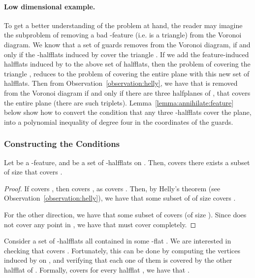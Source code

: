 \InSubmitVer{\documentclass[11pt]{article}}
\numberwithin{figure}{section}
\numberwithin{table}{section}
\numberwithin{equation}{section}
\newcommand{\lemlab}[1]{\label{lemma:#1}}
\newcommand{\lemref}[1]{Lemma~\ref{lemma:#1}}
\newcommand{\obslab}[1]{\label{observation:#1}}
\newcommand{\obsref}[1]{Observation~\ref{observation:#1}}
\begin{document}
\paragraph{Low dimensional example.}
To get a better understanding of the problem at hand, the reader may
imagine the subproblem of removing a bad -feature 
(i.e.  is a triangle) from the Voronoi diagram. We know that
a set  of  guards removes  from the Voronoi
diagram, if and only if the  -halfflats induced by 
cover the triangle . If we add the feature-induced halfflats
induced by  to the above set of halfflats, then the problem
of covering the triangle , reduces to the problem of
covering the entire plane with this new set  of 
halfflats. Then from \obsref{helly}, we have that  is
removed from the Voronoi diagram if and only if there are three
halfplanes of , that covers the entire plane (there are 
such triplets).  \lemref{annihilate:feature} below show how to convert
the condition that any three -halfflats cover the plane, into a
polynomial inequality of degree four in the coordinates of the guards.


\subsubsection{Constructing the Conditions}



\begin{lemma}
    \lemlab{feature:cover}
Let  be a -feature, and  be a set of
    -halfflats on .  Then,  covers
      there exists a subset  of size  that covers
    .
\end{lemma}

\begin{proof}    
    If  covers , then  covers , as
     covers
    . Then, by Helly's theorem (see
    \obsref{helly}), we have that some subset of  of size 
    covers .
    
    For the other direction, we have that some subset of  covers
     (of size ).  Since 
    does not cover any point in , we have that  must cover  completely.
\end{proof}



\begin{observation}
    \obslab{plane:cover}Consider a set  of  -halfflats all contained in some
    -flat . We are interested in checking that  covers
    . Fortunately, this can be done by computing the 
    vertices induced by  on , and verifying that each one
    of them is covered by the other halfflat of . Formally, 
    covers   for every halfflat , we have that
    .
\end{observation}
\end{document}
